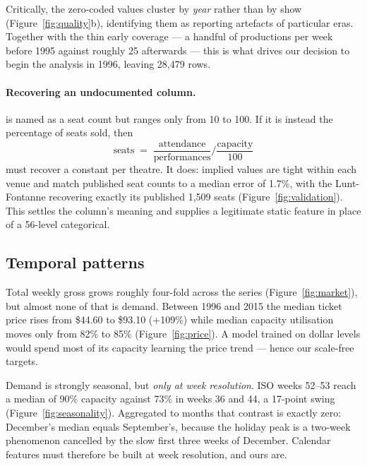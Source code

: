 Critically, the zero-coded values cluster by \emph{year} rather than by show
(Figure~\ref{fig:quality}b), identifying them as reporting artefacts of
particular eras. Together with the thin early coverage --- a handful of
productions per week before 1995 against roughly 25 afterwards --- this is what
drives our decision to begin the analysis in 1996, leaving 28{,}479 rows.

\paragraph{Recovering an undocumented column.}
 is named as a seat count but ranges only from 10 to
100. If it is instead the percentage of seats sold, then
\begin{equation}
\text{seats} \;=\; \frac{\text{attendance}}{\text{performances}}
\Big/ \frac{\text{capacity}}{100}
\label{eq:identity}
\end{equation}
must recover a constant per theatre. It does: implied values are tight within
each venue and match published seat counts to a median error of 1.7\%, with the
Lunt-Fontanne recovering exactly its published 1{,}509 seats
(Figure~\ref{fig:validation}). This settles the column's meaning and supplies a
legitimate static feature in place of a 56-level categorical.

\subsection{Temporal patterns}

Total weekly gross grows roughly four-fold across the series
(Figure~\ref{fig:market}), but almost none of that is demand. Between 1996 and
2015 the median ticket price rises from \$44.60 to \$93.10 (+109\%) while median
capacity utilisation moves only from 82\% to 85\% (Figure~\ref{fig:price}). A
model trained on dollar levels would spend most of its capacity learning the
price trend --- hence our scale-free targets.

Demand is strongly seasonal, but \emph{only at week resolution}. ISO weeks
52--53 reach a median of 90\% capacity against 73\% in weeks 36 and 44, a
17-point swing (Figure~\ref{fig:seasonality}). Aggregated to months that
contrast is exactly zero: December's median equals September's, because the
holiday peak is a two-week phenomenon cancelled by the slow first three weeks of
December. Calendar features must therefore be built at week resolution, and ours
are.

